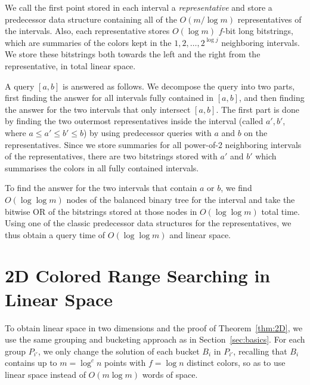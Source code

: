 We call the first point stored in each interval a \emph{representative} and store a predecessor data structure containing all of the $O(m / \log m)$ representatives of the intervals. Also, each representative stores $O(\log m)$ $f$-bit long bitstrings, which are summaries of the colors kept in the $1, 2, \ldots, 2^{\log j}$ neighboring intervals. We store these bitstrings both towards the left and the right from the representative, in total linear space.


A query $[a, b]$ is answered as follows. 
We decompose the query into two parts, first finding the answer for all intervals fully contained in $[a, b]$, and then finding the answer for the two intervals that only intersect $[a, b]$. 
The first part is done by finding the two outermost representatives inside the interval (called $a', b'$, where $a \leq a' \leq b' \leq b$) by using predecessor queries with $a$ and $b$ on the representatives. 
Since we store summaries for all power-of-2 neighboring intervals of the representatives, there are two bitstrings stored with $a'$ and $b'$ which summarises the colors in all fully contained intervals. 

To find the answer for the two intervals that contain $a$ or $b$, we find $O(\log \log m)$ nodes of the balanced binary tree for the interval and take the bitwise OR of the bitstrings stored at those nodes in $O(\log \log m)$ total time. Using one of the classic predecessor data structures \cite{van1976design, mehlhorn1990bounded, willard1983log} for the representatives, we thus obtain a query time of $O(\log \log m)$ and linear space.


\section{2D Colored Range Searching in Linear Space}
\label{sec:linear}
%
To obtain linear space in two dimensions and the proof of Theorem~\ref{thm:2D}, we use the same grouping and bucketing approach as in Section~\ref{sec:basics}. For each group $P_{i'}$, we only change the solution of each bucket $B_i$ in $P_{i'}$, recalling that $B_i$ contains up to $m = \log^c n$ points with $f = \log n$ distinct colors, so as to use linear space instead of $O(m \log m)$ words of space. 

